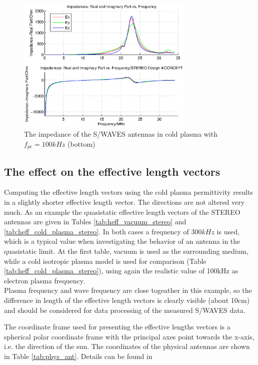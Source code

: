 \documentclass[two-column,ras]{agutex}
\begin{document}
\begin{article}
\begin{figure}
\noindent\includegraphics[width=20pc]{impedance_stereo_pl_100khz.eps}
  \caption{The impedance of the S/WAVES antennas in cold plasma with $f_{pe}=100kHz$ (bottom)}\label{fig:imp_stereo_fix_100kHz}
\end{figure}

\subsection{The effect on the effective length vectors}
Computing the effective length vectors using the cold plasma permittivity results in a slightly shorter effective length vector. The directions are not altered very much. As an example the quasistatic effective length vectors of the STEREO antennas are given in Tables \ref{tab:heff_vacuum_stereo} and \ref{tab:heff_cold_plasma_stereo}. In both cases a frequency of $300kHz$ is used, which is a typical value when investigating the behavior of an antenna in the quasistatic limit. At the first table, vacuum is used as the surrounding medium, while a cold isotropic plasma model is used for comparison (Table \ref{tab:heff_cold_plasma_stereo}), using again the realistic value of 100kHz as electron plasma frequency.\\

Plasma frequency and wave frequency are close togeather in this example, so the difference in length of the effective length vectors is clearly visible (about 10cm) and should be considered for data processing of the measured S/WAVES data.

The coordinate frame used for presenting the effective lengths vectors is a spherical polar coordinate frame with the principal axes point towards the x-axis, i.e. the direction of the sun. The coordinates of the physical antennas are shown in Table \ref{tab:phys_ant}. Details can be found in \cite{ossi09} \\


\end{article}
\end{document}
